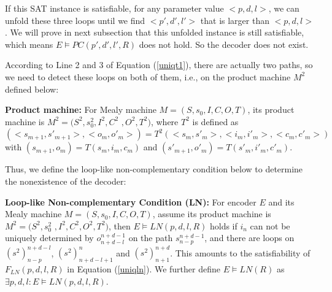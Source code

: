 \documentclass[journal]{IEEEtran}
\begin{document}
If this SAT instance is satisfiable,
for any parameter value $<p,d,l>$,
we can unfold these three loops until we find $<p',d',l'>$ that is larger than $<p,d,l>$.
We will prove in next subsection that this unfolded instance is still satisfiable,
which means $E\vDash PC(p',d',l',R)$ does not hold.
So the decoder does not exist.

According to Line 2 and 3 of Equation (\ref{uniqt1}),
there are actually two paths,
so we need to detect these loops on both of them,
i.e.,
on the product machine $M^2$ defined below:

\begin{definition11}%
\textbf{Product machine:} For Mealy machine $M=(S,s_0,I,C,O,T)$,
its product machine is $M^2=(S^2,s_0^2,I^2,C^2$ $,O^2,T^2)$,
where
$T^2$ is defined as $(<s_{m+1},s'_{m+1}>,<o_m,o'_m>)=T^2(<s_m,s'_m>,<i_m,i'_m>,<c_m,c'_m>)$ with $(s_{m+1},o_m)=T(s_m,i_m,c_m)$ and $(s'_{m+1},o'_m)=T(s'_m,i'_m,c'_m)$.
\end{definition11}

Thus,
we define the loop-like non-complementary condition below to determine the nonexistence of the decoder:

\begin{definition11}\label{def_lnc}%
\textbf{Loop-like Non-complementary Condition (LN):} For encoder $E$ and its Mealy machine $M=(S,s_0,I,C,O,T)$,
assume its product machine is $M^2=(S^2,s_0^2$ $,I^2,C^2,O^2,T^2)$,
then $E\vDash LN(p,d,l,R)$ holds if
$i_n$ can not be uniquely determined by $o_{n+d-l}^{n+d-1}$ on the path $s_{n-p}^{n+d-1}$,
and there are loops on $(s^2)_{n-p}^{n+d-l}$, $(s^2)_{n+d-l+1}^n$ and $(s^2)_{n+1}^{n+d}$.
This amounts to the satisfiability of $F_{LN}(p,d,l,R)$ in Equation (\ref{uniqln}).
We further define $E\vDash LN(R)$ as $\exists p,d,l:E\vDash LN(p,d,l,R)$.
\end{definition11}
\end{document}
